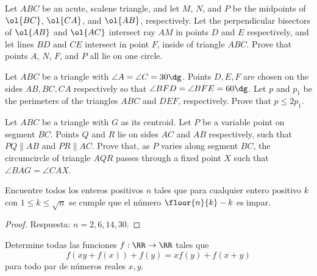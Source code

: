 
\begin{probEG}[USAMO 2008/2]
	Let $ABC$ be an acute, scalene triangle, and let $M$, $N$, and $P$ be the midpoints of $\ol{BC}$, $\ol{CA}$, and $\ol{AB}$, respectively. Let the perpendicular bisectors of $\ol{AB}$ and $\ol{AC}$ intersect ray $AM$ in points $D$ and $E$ respectively, and let lines $BD$ and $CE$ intersect in point $F$, inside of triangle $ABC$. Prove that points $A$, $N$, $F$, and $P$ all lie on one circle.
\end{probEG}


\begin{probMG}
	Let $ABC$ be a triangle with $\angle A=\angle C=30\dg$. Points $D,E,F$ are chosen on the sides $AB,BC,CA$ respectively so that $\angle BFD=\angle BFE=60\dg$. Let $p$ and $p_1$ be the perimeters of the triangles $ABC$ and $DEF$, respectively. Prove that $p\le 2p_1$.
\end{probMG}

\begin{probEG}
	Let $ABC$ be a triangle with $G$ as its centroid. Let $P$ be a variable point on segment $BC$. Points $Q$ and $R$ lie on sides $AC$ and $AB$ respectively, such that $PQ\parallel AB$ and $PR\parallel AC$. Prove that, as $P$ varies along segment $BC$, the circumcircle of triangle $AQR$ passes through a fixed point $X$ such that $\angle BAG=\angle CAX$.
\end{probEG}


\begin{probEG}
	Encuentre todos los enteros positivos $n$ tales que para cualquier entero positivo $k$ con $1\le k\le\sqrt{n}$ se cumple que el número $\floor{n}{k}-k$ es impar.
\end{probEG}

\begin{proof}
	Respuesta: $n=2,6,14,30$.
\end{proof}

\begin{probEG}
	Determine todas las funciones $f:\RR\to\RR$ tales que
	\[f(xy+f(x))+f(y)=xf(y)+f(x+y)\]
	para todo par de números reales $x,y$.
\end{probEG}

